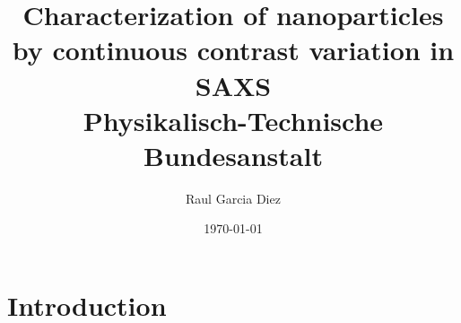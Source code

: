 \documentclass[12pt]{report}
\title{
	{Characterization of nanoparticles by continuous contrast variation in SAXS}\\
	{\large Physikalisch-Technische Bundesanstalt}\\
}
\author{Raul Garcia Diez}
\date{\today}
\begin{document}
	\maketitle
	\tableofcontents
	
	\chapter{Introduction}
	

	
\end{document}
